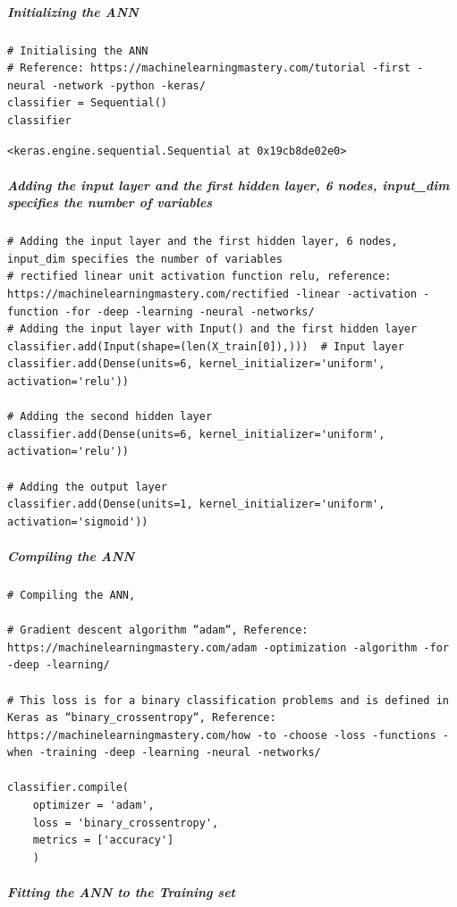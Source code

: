 \subparagraph{Initializing the ANN}

\begin{verbatim}
# Initialising the ANN
# Reference: https://machinelearningmastery.com/tutorial -first -neural -network -python -keras/
classifier = Sequential()
classifier
\end{verbatim}

\begin{verbatim}
<keras.engine.sequential.Sequential at 0x19cb8de02e0>
\end{verbatim}

\subparagraph{Adding the input layer and the first hidden layer, 6 nodes, input\_dim specifies the number of variables}

\begin{verbatim}
# Adding the input layer and the first hidden layer, 6 nodes, input_dim specifies the number of variables
# rectified linear unit activation function relu, reference: https://machinelearningmastery.com/rectified -linear -activation -function -for -deep -learning -neural -networks/
# Adding the input layer with Input() and the first hidden layer
classifier.add(Input(shape=(len(X_train[0]),)))  # Input layer
classifier.add(Dense(units=6, kernel_initializer='uniform', activation='relu'))

# Adding the second hidden layer
classifier.add(Dense(units=6, kernel_initializer='uniform', activation='relu'))

# Adding the output layer
classifier.add(Dense(units=1, kernel_initializer='uniform', activation='sigmoid'))
\end{verbatim}

\subparagraph{Compiling the ANN}

\begin{verbatim}
# Compiling the ANN, 

# Gradient descent algorithm “adam“, Reference: https://machinelearningmastery.com/adam -optimization -algorithm -for -deep -learning/

# This loss is for a binary classification problems and is defined in Keras as “binary_crossentropy“, Reference: https://machinelearningmastery.com/how -to -choose -loss -functions -when -training -deep -learning -neural -networks/

classifier.compile(
    optimizer = 'adam', 
    loss = 'binary_crossentropy', 
    metrics = ['accuracy']
    )
\end{verbatim}

\subparagraph{Fitting the ANN to the Training set}

